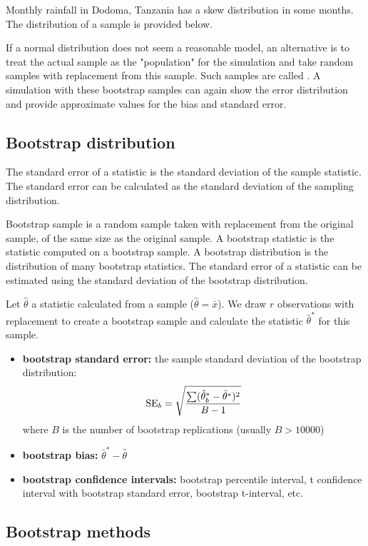 \begin{example}
	Monthly rainfall in Dodoma, Tanzania has a skew distribution in some months. The distribution of a sample is provided below.
	
	
	
	If a normal distribution does not seem a reasonable model, an alternative is to treat the actual sample as the "population" for the simulation and take random samples with replacement from this sample. Such samples are called . A simulation with these bootstrap samples can again show the error distribution and provide approximate values for the bias and standard error.
	
	
	
\end{example}

\subsection{Bootstrap distribution}

The standard error of a statistic is the standard deviation of the sample statistic. The standard error can be calculated as the standard deviation of the sampling distribution.

Bootstrap sample is a random sample taken with replacement from the original sample, of the same size as the original sample. A bootstrap statistic is the statistic computed on a bootstrap sample. A bootstrap distribution is the distribution of many bootstrap statistics. The standard error of a statistic can be estimated using the standard deviation of the bootstrap distribution.

Let $\hat{\theta}$ a statistic calculated from a sample ($\hat{\theta} = \bar{x}$). We draw $r$ observations with replacement to create a bootstrap sample and calculate the statistic $\hat{\theta}^\ast$ for this sample.
\begin{itemize}
	\item \textbf{bootstrap standard error:} the sample standard deviation of the bootstrap distribution:
	\begin{align}
		\operatorname{SE}_b = \sqrt{\frac{\sum (\hat{\theta}^\ast_b - \bar{\theta}^\ast)^2}{B-1}} \notag
	\end{align}
	where $B$ is the number of bootstrap replications (usually $B>10000$)
	\item \textbf{bootstrap bias:} $\bar{\theta}^\ast-\hat{\theta}$
	\item \textbf{bootstrap confidence intervals:} bootstrap percentile interval, t confidence interval with bootstrap standard error, bootstrap t-interval, etc.
\end{itemize}

\subsection{Bootstrap methods}